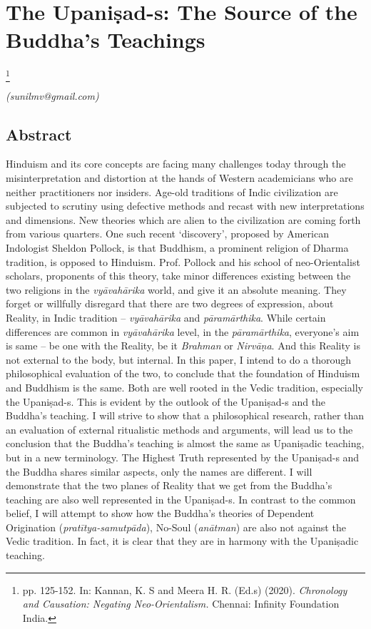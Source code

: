 
\chapter{The Upaniṣad-s: The Source of the Buddha’s Teachings}\label{chapter4}

\footnote{pp. 125-152. In: Kannan, K. S and Meera H. R. (Ed.s) (2020). \textit{Chronology and Causation: Negating Neo-Orientalism.} Chennai: Infinity Foundation India.}

\begin{flushright}
\textit{(sunilmv@gmail.com)}
\end{flushright}

\setcounter{endnote}{0}

\section*{Abstract}

Hinduism and its core concepts are facing many challenges today through the misinterpretation and distortion at the hands of Western academicians who are neither practitioners nor insiders. Age-old traditions of Indic civilization are subjected to scrutiny using defective methods and recast with new interpretations and dimensions. New theories which are alien to the civilization are coming forth from various quarters. One such recent ‘discovery’, proposed by American Indologist Sheldon Pollock, is that Buddhism, a prominent religion of Dharma tradition, is opposed to Hinduism. Prof. Pollock and his school of neo-Orientalist scholars, proponents of this theory, take minor differences existing between the two religions in the \textit{vyāvahārika} world, and give it an absolute meaning. They forget or willfully disregard that there are two degrees of expression, about Reality, in Indic tradition – \textit{vyāvahārika} and \textit{pāramārthika}. While certain differences are common in \textit{vyāvahārika} level, in the \textit{pāramārthika}, everyone’s aim is same – be one with the Reality, be it \textit{Brahman} or \textit{Nirvāṇa}. And this Reality is not external to the body, but internal. In this paper, I intend to do a thorough philosophical evaluation of the two, to conclude that the foundation of Hinduism and Buddhism is the same. Both are well rooted in the Vedic tradition, especially the Upaniṣad-s. This is evident by the outlook of the Upaniṣad-s and the Buddha’s teaching. I will strive to show that a philosophical research, rather than an evaluation of external ritualistic methods and arguments, will lead us to the conclusion that the Buddha’s teaching is almost the same as Upaniṣadic teaching, but in a new terminology. The Highest Truth represented by the Upaniṣad-s and the Buddha shares similar aspects, only the names are different. I will demonstrate that the two planes of Reality that we get from the Buddha’s teaching are also well represented in the Upaniṣad-s. In contrast to the common belief, I will attempt to show how the Buddha’s theories of Dependent Origination (\textit{pratītya-samutpāda}), No-Soul (\textit{anātman}) are also not against the Vedic tradition. In fact, it is clear that they are in harmony with the Upaniṣadic teaching.


